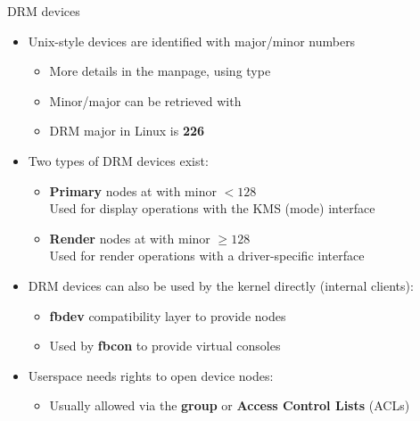 \begin{frame}{DRM devices}
  \begin{itemize}
  \item Unix-style devices are identified with major/minor numbers
    \begin{itemize}
    \item More details in the  manpage, using  type
    \item Minor/major can be retrieved with 
    \item DRM major in Linux is \textbf{226}
    \end{itemize}
  \item Two types of DRM devices exist:
    \begin{itemize}
    \item \textbf{Primary} nodes at  with minor \(< 128\)\\
    Used for display operations with the KMS (mode) interface
    \item \textbf{Render} nodes at  with minor \(\geq 128\)\\
    Used for render operations with a driver-specific interface
    \end{itemize}
  \item DRM devices can also be used by the kernel directly (internal clients):
    \begin{itemize}
    \item \textbf{fbdev} compatibility layer to provide  nodes
    \item Used by \textbf{fbcon} to provide virtual consoles
    \end{itemize}
  \item Userspace needs rights to open device nodes:
    \begin{itemize}
    \item Usually allowed via the  \textbf{group} or \textbf{Access Control Lists} (ACLs)
    \end{itemize}
  \end{itemize}
\end{frame}

